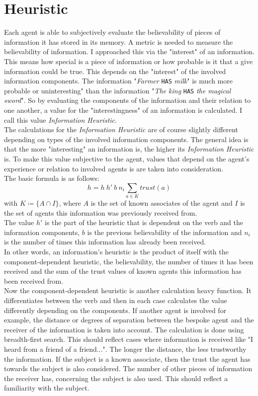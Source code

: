 \section{Heuristic}
Each agent is able to subjectively evaluate the believability of pieces of information it has stored in its memory. A metric is needed to measure the believability of information. I approached this via the "interest" of an information. This means how special is a piece of information or how probable is it that a give information could be true. This depends on the "interest" of the involved information components. The information "\textit{Farmer} \verb|HAS| \textit{milk}" is much more probable or uninteresting" than the information "\textit{The king} \verb|HAS| \textit{the magical sword}". So by evaluating the components of the information and their relation to one another, a value for the "interestingness" of an information is calculated. I call this value \textit{Information Heuristic}.\\
The calculations for the \textit{Information Heuristic} are of course slightly different depending on types of the involved information components. The general idea is that the more "interesting" an information is, the higher its \textit{Information Heuristic} is. To make this value subjective to the agent, values that depend on the agent's experience or relation to involved agents is are taken into consideration.\\
The basic formula is as follows:
\begin{equation}
	h = h\ h'\ b\ n_i\sum_{a \in K}trust(a)
\end{equation}
with $K \coloneqq \{A \cap I\}$, where $A$ is the set of known associates of the agent and $I$ is the set of agents this information was previously received from.\\
The value $h'$ is the part of the heuristic that is dependent on the verb and the information components, $b$ is the previous believability of the information and $n_i$ is the number of times this information has already been received.\\
In other words, an information's heuristic is the product of itself with the component-dependent heuristic, the believability, the number of times it has been received and the sum of the trust values of known agents this information has been received from. \\
Now the component-dependent heuristic is another calculation heavy function. It differentiates between the verb and then in each case calculates the value differently depending on the components. If another agent is involved for example, the distance or degrees of separation between the bespoke agent and the receiver of the information is taken into account. The calculation is done using breadth-first search. This should reflect cases where information is received like "I heard from a friend of a friend...". The longer the distance, the less trustworthy the information. If the subject is a known associate, then the trust the agent has towards the subject is also considered. The number of other pieces of information the receiver has, concerning the subject is also used. This should reflect a familiarity with the subject.\\
